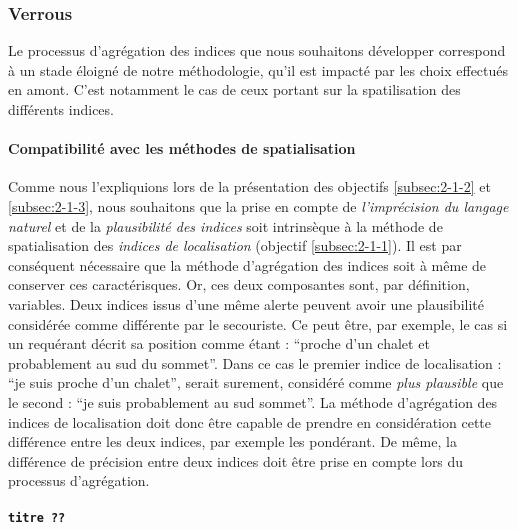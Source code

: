 
\subsubsection{Verrous}

Le processus d'agrégation des indices que nous souhaitons développer
correspond à un stade éloigné de notre méthodologie, \ie qu'il est
impacté par les choix effectués en amont. C'est notamment le cas de
ceux portant sur la spatilisation des différents indices.

\paragraph{Compatibilité avec les méthodes de spatialisation}

Comme nous l'expliquions lors de la présentation des objectifs
\ref{subsec:2-1-2} et \ref{subsec:2-1-3}, nous souhaitons que la prise
en compte de \emph{l'imprécision du langage naturel} et de la
\emph{plausibilité des indices} soit intrinsèque à la méthode de
spatialisation des \emph{indices de localisation} (objectif
\ref{subsec:2-1-1}). Il est par conséquent nécessaire que la méthode
d'agrégation des indices soit à même de conserver ces caractérisques.
% 
Or, ces deux composantes sont, par définition, variables. Deux indices
issus d'une même alerte peuvent avoir une plausibilité considérée
comme différente par le secouriste. Ce peut être, par exemple, le cas
si un requérant décrit sa position comme étant : \enquote{proche d'un
  chalet et probablement au sud du sommet}. Dans ce cas le premier
indice de localisation : \enquote{je suis proche d'un chalet}, serait
surement, considéré comme \emph{plus plausible} que le second :
\enquote{je suis probablement au sud sommet}. La méthode d'agrégation
des indices de localisation doit donc être capable de prendre en
considération cette différence entre les deux indices, par exemple les
pondérant. De même, la différence de précision entre deux indices doit
être prise en compte lors du processus d'agrégation.

\paragraph{\texttt{titre ??}}

